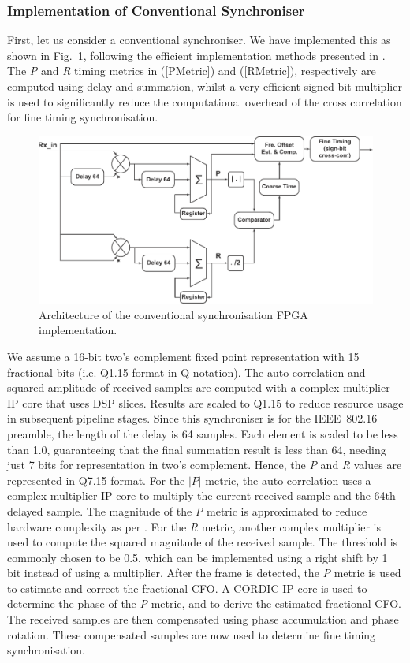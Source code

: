 		\subsubsection{Implementation of Conventional Synchroniser}

First, let us consider a conventional synchroniser. We have implemented this as shown in Fig.~\ref{fig:Con-Sync}, following the efficient implementation methods presented in \cite{Manavi2004,Wang2004,Guffey2007,Liu2009}.
The \emph{P} and \emph{R} timing metrics in (\ref{PMetric}) and (\ref{RMetric}), respectively are computed using delay and summation, whilst a very efficient signed bit multiplier \cite{Schwoerer2002} is used to significantly reduce the computational overhead of the cross correlation for fine timing synchronisation.

\begin{figure}[h]
	\centerline{\includegraphics [width=0.8\columnwidth] {figures/Con_Sync.pdf}}
	\caption{Architecture of the conventional synchronisation FPGA implementation.}
	\label{fig:Con-Sync}
\end{figure}

We assume a 16-bit two's complement fixed point representation with 15 fractional bits (i.e. Q1.15 format in Q-notation).
The auto-correlation and squared amplitude of received samples are computed with a complex multiplier IP core that uses DSP slices.
Results are scaled to Q1.15 to reduce resource usage in subsequent pipeline stages.
Since this synchroniser is for the IEEE~802.16 preamble, the length of the delay is 64 samples.
Each element is scaled to be less than 1.0, guaranteeing that the final summation result is less than 64, needing just 7 bits for representation in two's complement.
Hence, the \emph{P} and \emph{R} values are represented in Q7.15 format.
For the $|P|$ metric, the auto-correlation uses a complex multiplier IP core to multiply the current received sample and the 64th delayed sample.
The magnitude of the \emph{P} metric is approximated to reduce hardware complexity as per \cite{Liu2009}.
For the \emph{R} metric, another complex multiplier is used to compute the squared magnitude of the received sample.
The threshold is commonly chosen to be 0.5, which can be implemented using a right shift by 1 bit \cite{Kim2008} instead of using a multiplier.
After the frame is detected, the \emph{P} metric is used to estimate and correct the fractional CFO.
A CORDIC IP core is used to determine the phase of the \emph{P} metric, and to derive the estimated fractional CFO.
The received samples are then compensated using phase accumulation and phase rotation.
These compensated samples are now used to determine fine timing synchronisation.

